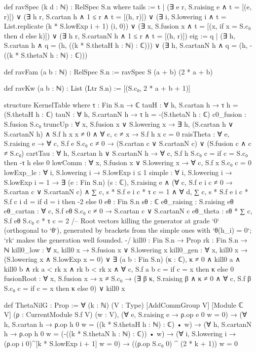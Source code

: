 \begin{leancode}
def ravSpec (k d : ℕ) : RelSpec S.n where
  tails := {t | (∃ e r, S.raising e ∧ t = [(e, r)]) ∨ (∃ h r, S.cartan h ∧ 1 ≤ r ∧ t = [(h, r)]) ∨
    (∃ i, S.lowering i ∧ t = List.replicate (k * S.lowExp i + 1) (i, 0)) ∨
    (∃ x, S.fusion x ∧ t = [(x, if x = S.c₀ then d else k)]) ∨
    (∃ h r, S.cartanN h ∧ 1 ≤ r ∧ t = [(h, r)])}
  eig := {q | (∃ h, S.cartan h ∧ q = (h, ((k * S.thetaH h : ℕ) : ℂ))) ∨
    (∃ h, S.cartanN h ∧ q = (h, -((k * S.thetaN h : ℕ) : ℂ)))}

def ravFam (a b : ℕ) : RelSpec S.n := ravSpec S (a + b) (2 * a + b)

def ravKw (a b : ℕ) : List (Ltr S.n) := [(S.c₀, 2 * a + b + 1)]

structure KernelTable where
  τ : Fin S.n → ℂ
  tauH : ∀ h, S.cartan h → τ h = (S.thetaH h : ℂ)
  tauN : ∀ h, S.cartanN h → τ h = -(S.thetaN h : ℂ)
  c0_fusion : S.fusion S.c₀
  truncUp : ∀ x, S.fusion x ∨ S.lowering x →
    ∃ h, (S.cartan h ∨ S.cartanN h) ∧ S.f h x x ≠ 0 ∧ ∀ c, c ≠ x → S.f h x c = 0
  raisTheta : ∀ e, S.raising e → ∀ c, S.f e S.c₀ c ≠ 0 →
    (S.cartan c ∨ S.cartanN c) ∨ (S.fusion c ∧ c ≠ S.c₀)
  cartTau : ∀ h, S.cartan h ∨ S.cartanN h → ∀ c, S.f h S.c₀ c = if c = S.c₀ then -τ h else 0
  lowComm : ∀ x, S.fusion x ∨ S.lowering x → ∀ c, S.f x S.c₀ c = 0
  lowExp_le : ∀ i, S.lowering i → S.lowExp i ≤ 1
  simple : ∀ i, S.lowering i → S.lowExp i = 1 → ∃ (e : Fin S.n) (s : ℂ), S.raising e ∧
    (∀ c, S.f e i c ≠ 0 → S.cartan c ∨ S.cartanN c) ∧ ∑ c, s * S.f e i c * τ c = 1 ∧
    ∀ d, ∑ c, s * S.f e i c * S.f c i d = if d = i then -2 else 0
  eθ : Fin S.n
  sθ : ℂ
  eθ_raising : S.raising eθ
  eθ_cartan : ∀ c, S.f eθ S.c₀ c ≠ 0 → S.cartan c ∨ S.cartanN c
  eθ_theta : sθ * ∑ c, S.f eθ S.c₀ c * τ c = 2
  /-- Root vectors killing the generator at grade `0` (orthogonal to `θ`), generated by brackets
  from the simple ones with `θ(h_i) = 0`; `rk` makes the generation well founded. -/
  kill0 : Fin S.n → Prop
  rk : Fin S.n → ℕ
  kill0_low : ∀ x, kill0 x → S.fusion x ∨ S.lowering x
  kill0_gen : ∀ x, kill0 x → (S.lowering x ∧ S.lowExp x = 0) ∨
    ∃ (a b : Fin S.n) (κ : ℂ), κ ≠ 0 ∧ kill0 a ∧ kill0 b ∧ rk a < rk x ∧ rk b < rk x ∧
      ∀ c, S.f a b c = if c = x then κ else 0
  fusionRoot : ∀ x, S.fusion x → x ≠ S.c₀ →
    (∃ β κ, S.raising β ∧ κ ≠ 0 ∧ ∀ c, S.f β S.c₀ c = if c = x then κ else 0) ∨ kill0 x

def ThetaNilG : Prop :=
  ∀ (k : ℕ) (V : Type) [AddCommGroup V] [Module ℂ V] (ρ : CurrentModule S.f V) (w : V),
    (∀ e, S.raising e → ρ.op e 0 w = 0) →
    (∀ h, S.cartan h → ρ.op h 0 w = ((k * S.thetaH h : ℕ) : ℂ) • w) →
    (∀ h, S.cartanN h → ρ.op h 0 w = (-((k * S.thetaN h : ℕ) : ℂ)) • w) →
    (∀ i, S.lowering i → (ρ.op i 0)^[k * S.lowExp i + 1] w = 0) →
    ((ρ.op S.c₀ 0) ^ (2 * k + 1)) w = 0
\end{leancode}

